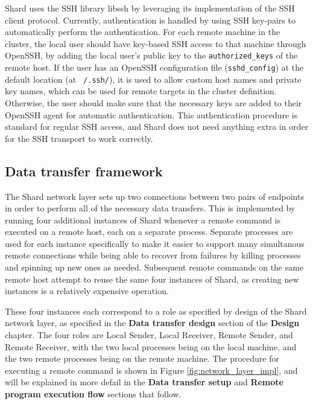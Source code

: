 \documentclass[twoside]{report}
\begin{document}
Shard uses the SSH library libssh by leveraging its implementation of the SSH client protocol.
Currently, authentication is handled by using SSH key-pairs to automatically perform the authentication.
For each remote machine in the cluster, the local user should have key-based SSH access to that machine through OpenSSH, by adding the local user's public key to the \texttt{authorized\_keys} of the remote host.
If the user has an OpenSSH configuration file (\texttt{sshd\_config}) at the default location (at \texttt{~/.ssh/}), it is used to allow custom host names and private key names, which can be used for remote targets in the cluster definition.
Otherwise, the user should make sure that the necessary keys are added to their OpenSSH agent for automatic authentication.
This authentication procedure is standard for regular SSH access, and Shard does not need anything extra in order for the SSH transport to work correctly.

\subsection{Data transfer framework}

The Shard network layer sets up two connections between two pairs of endpoints in order to perform all of the necessary data transfers.
This is implemented by running four additional instances of Shard whenever a remote command is executed on a remote host, each on a separate process.
Separate processes are used for each instance specifically to make it easier to support many simultanous remote connections while being able to recover from failures by killing processes and spinning up new ones as needed.
Subsequent remote commands on the same remote host attempt to reuse the same four instances of Shard, as creating new instances is a relatively expensive operation.

These four instances each correspond to a role as specified by design of the Shard network layer, as specified in the \textbf{Data transfer design} section of the \textbf{Design} chapter.
The four roles are Local Sender, Local Receiver, Remote Sender, and Remote Receiver, with the two local processes being on the local machine, and the two remote processes being on the remote machine.
The procedure for executing a remote command is shown in Figure \ref{fig:network_layer_impl}, and will be explained in more defail in the \textbf{Data transfer setup} and \textbf{Remote program execution flow} sections that follow.
\end{document}
